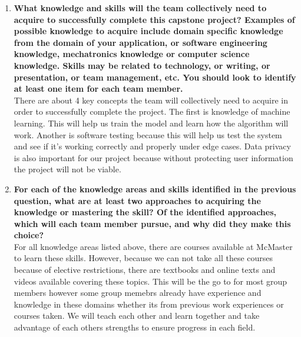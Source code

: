 \documentclass{scrreprt}
\theoremstyle{definition}
\begin{document}
\begin{enumerate}
  \item \textbf{What knowledge and skills will the team collectively need to acquire to
  successfully complete this capstone project?  Examples of possible knowledge
  to acquire include domain specific knowledge from the domain of your
  application, or software engineering knowledge, mechatronics knowledge or
  computer science knowledge.  Skills may be related to technology, or writing,
  or presentation, or team management, etc.  You should look to identify at
  least one item for each team member.}\\
There are about 4 key concepts the team will collectively need to acquire in order to successfully complete the project. The first is knowledge of machine learning. This will help us train the model and learn how the algorithm will work. Another is software testing because this will help us test the system and see if it's working correctly and properly under edge cases. Data privacy is also important for our project because without protecting user information the project will not be viable.
  \item \textbf{For each of the knowledge areas and skills identified in the previous
  question, what are at least two approaches to acquiring the knowledge or
  mastering the skill?  Of the identified approaches, which will each team
  member pursue, and why did they make this choice?}\\
For all knowledge areas listed above, there are courses available at McMaster to learn these skills. However, because we can not take all these courses because of elective restrictions, there are textbooks and online texts and videos available covering these topics. This will be the go to for most group members however some group memebrs already have experience and knowledge in these domains whether its from previous work experiences or courses taken. We will teach each other and learn together and take advantage of each others strengths to ensure progress in each field. 
\end{enumerate}


\end{document}
